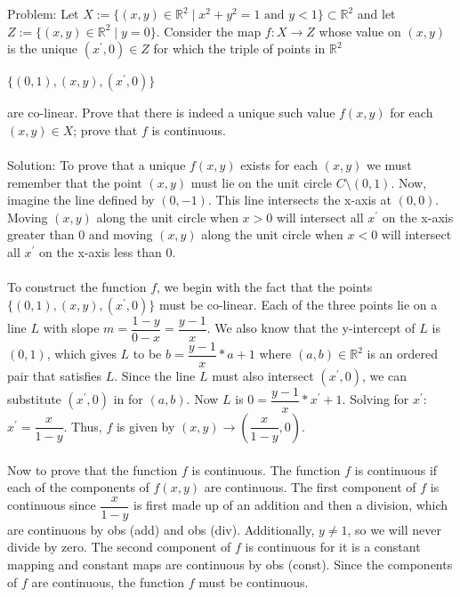 \documentclass{article}
\begin{document}
Problem: Let $X := \{ (x,y) \in \mathbb{R}^2 \mid x^2+y^2=1 \text{ and } y<1 \} \subset \mathbb{R}^2$ and let $Z := \{(x,y) \in \mathbb{R}^2 \mid y=0 \}$. Consider the map $f:X \to Z$ whose value on $(x,y)$ is the unique $(x^\prime , 0) \in Z$ for which the triple of points in $\mathbb{R}^2$
\begin{center}
	$\{(0,1), (x,y), (x^\prime, 0)\}$
\end{center}
are co-linear. Prove that there is indeed a unique such value $f(x,y)$ for each $(x,y) \in X$; prove that $f$ is continuous. \\\\
Solution: To prove that a unique $f(x,y)$ exists for each $(x,y)$ we must remember that the point $(x,y)$ must lie on the unit circle $C \setminus (0,1)$. Now, imagine the line defined by $(0,-1)$. This line intersects the x-axis at $(0,0)$. Moving $(x,y)$ along the unit circle when $x > 0$ will intersect all $x^\prime$ on the x-axis greater than 0 and moving $(x,y)$ along the unit circle when $x < 0$ will intersect all $x^\prime$ on the x-axis less than 0. \\\\
To construct the function $f$, we begin with the fact that the points $\{(0,1), (x,y), (x^\prime, 0)\}$ must be co-linear. Each of the three points lie on a line $L$ with slope $m = \dfrac{1 - y}{0 - x} = \dfrac{y - 1}{x}$. We also know that the y-intercept of $L$ is $(0, 1)$, which gives $L$ to be $b = \dfrac{y - 1}{x} * a + 1$ where $(a,b) \in \mathbb{R}^2$ is an ordered pair that satisfies $L$. Since the line $L$ must also intersect $(x^\prime , 0)$, we can substitute $(x^\prime , 0)$ in for $(a,b)$. Now $L$ is $0 = \dfrac{y - 1}{x} * x^\prime + 1$. Solving for $x^\prime$: $x^\prime = \dfrac{x}{1 - y}$. Thus, $f$ is given by $(x,y) \to (\dfrac{x}{1-y}, 0)$. \\\\
Now to prove that the function $f$ is continuous. The function $f$ is continuous if each of the components of $f(x,y)$ are continuous. The first component of $f$ is continuous since $\dfrac{x}{1 - y}$ is first made up of an addition and then a division, which are continuous by obs (add) and obs (div). Additionally, $y \neq 1$, so we will never divide by zero. The second component of $f$ is continuous for it is a constant mapping and constant maps are continuous by obs (const). Since the components of $f$ are continuous, the function $f$ must be continuous.

\newpage
\end{document}
